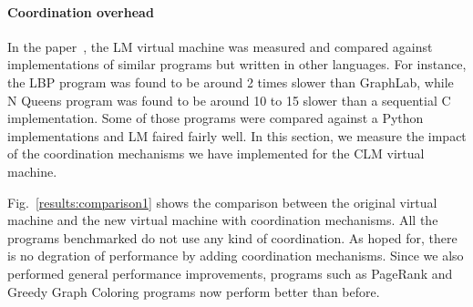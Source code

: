 \paragraph{Coordination overhead}

In the paper~\cite{cruz-ppdp14}, the LM virtual machine was measured and
compared against implementations of similar programs but written in other
languages. For instance, the LBP program was found to be around 2 times slower
than GraphLab, while N Queens program was found to be around 10 to 15 slower
than a sequential C implementation. Some of those programs were compared against
a Python implementations and LM faired fairly well. In this section, we measure
the impact of the coordination mechanisms we have implemented for the CLM
virtual machine.

Fig.~\ref{results:comparison1} shows the comparison between the original virtual
machine and the new virtual machine with coordination mechanisms. All the
programs benchmarked do not use any kind of coordination. As hoped for, there
is no degration of performance by adding coordination mechanisms. Since we also
performed general performance improvements, programs such as PageRank and Greedy
Graph Coloring programs now perform better than before.

\begin{topfig}
   \begin{center}
   \end{center}
\end{topfig}
